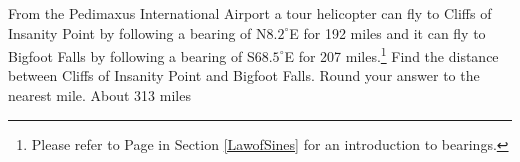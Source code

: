 { From the Pedimaxus International Airport a tour helicopter can fly to Cliffs of Insanity Point by following a bearing of N$8.2^{\circ}$E for 192 miles and it can fly to Bigfoot Falls by following a bearing of S$68.5^{\circ}$E for 207 miles.\footnote{Please refer to Page \pageref{bearings} in Section \ref{LawofSines} for an introduction to bearings.}  Find the distance between Cliffs of Insanity Point and Bigfoot Falls.  Round your answer to the nearest mile.  \label{lofcosinesbearingexercise}}
{ About 313 miles}
